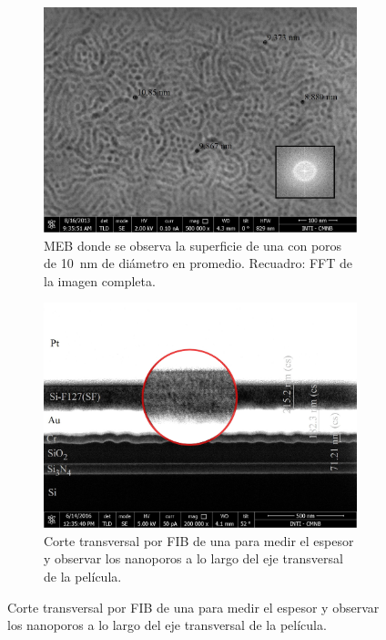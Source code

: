				\begin{figure}[bh!]
		 	   	    \begin{subfigure}[t]{0.495\textwidth}
			        	\includegraphics[width=\textwidth]{Imagenes/Superficie-F127-medidas.jpg}
			       		\caption{MEB donde se observa la superficie de una \pdmF\space con poros de \SI{10}{nm} de diámetro en promedio. Recuadro: FFT de la imagen completa.}
			       		\label{fig:sem_homogeneidad1}
			       		\end{subfigure}
			       	\begin{subfigure}[t]{0.495\textwidth}
			 	   	    \includegraphics[width=\textwidth]{Imagenes/Perfil-F127.jpg}
			       		\caption{Corte transversal por FIB de una \pdmF\space para medir el espesor y observar los nanoporos a lo largo del eje transversal de la película.}

\end{subfigure}
\end{figure}
